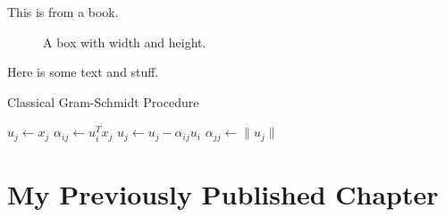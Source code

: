 \documentclass[12pt]{report} %
\numberwithin{equation}{subsection}
\numberwithin{figure}{chapter} %
\theoremstyle{numbernote}
\theoremstyle{nonumber}
\theoremstyle{nonumbernonote}
\theoremstyle{nonote}
\begin{document}
This is from a book. \parencite{sternberg1995group}  

\lipsum[1]

\begin{figure}[!htbp]
\centering
\vspace{25.92pt} %
\caption{A box with width and height.}
\label{A box with width and height}
\end{figure}

Here is some text and stuff.

\lipsum[1]

\begin{algorithm}[!htbp]
	\caption{Classical Gram-Schmidt Procedure}
	\begin{algorithmic}[1]
			\State $u_j \gets x_j$
				\State $\alpha_{ij} \gets u_i^Tx_j$
				\State $u_j \gets u_j - \alpha_{ij} u_i$
			\EndFor
		\State $\alpha_{jj} \gets \|u_j\|$
		\EndFor
	\end{algorithmic}
	\label{alg:ClassicalGramSchmidt}
\end{algorithm}

\lipsum[1]


\pagebreak


\chapter{My Previously Published Chapter}
\end{document}
